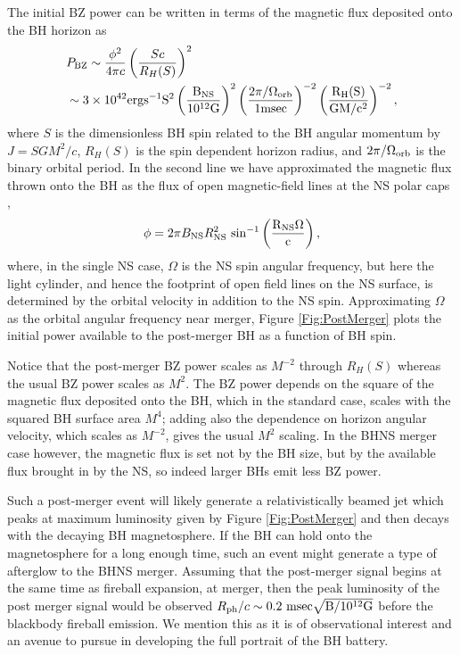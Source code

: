 The initial BZ power can be written in terms of the magnetic flux
deposited onto the BH horizon as
\begin{align}
  \label{Eq:PBZ}
&P_{\rm{BZ}} \sim \frac{\phi^2}{4 \pi c} \left(\frac{S
    c}{R_{H}(S)}\right)^2 \\ \nonumber 
%
&\sim 3 \times 10^{42}
  \rm{erg} \rm{s}^{-1} S^2 \left( \frac{B_{\rm{NS}} }{ 10^{12}
    G}\right)^2 \left( \frac{2 \pi / \Omega_{\rm{orb}} }{ 1 \rm{msec}}\right)^{-2}
  \left( \frac{R_H(S) }{ GM/c^2 }\right)^{-2} ,
\end{align}
where $S$ is the dimensionless BH spin related to the BH angular
momentum by $J = S GM^2/c$, $R_H(S)$ is the spin dependent horizon
radius, and $2 \pi / \Omega_{\rm{orb}}$ is the binary orbital period. In the second line we have approximated the magnetic flux
thrown onto the BH as the flux of open magnetic-field lines at the NS
polar caps \citep{GJ:1969, LyutikovMckinney:2011},
\begin{equation}
\phi = 2 \pi  B_{\rm NS} R^2_{\rm{NS}} \ \rm{sin}^{-1}\left(\frac{ R_{\rm{NS}} \Omega}{c}\right),
\end{equation}
where, in the single NS case, $\Omega$ is the NS spin angular
frequency, but here the light cylinder, and hence the footprint of
open field lines on the NS surface, is determined by the orbital
velocity in addition to the NS spin. Approximating $\Omega$ as the
orbital angular frequency near merger, Figure \ref{Fig:PostMerger}
plots the initial power available to the post-merger BH as a function
of BH spin.


Notice that the post-merger BZ power scales as $M^{-2}$ through
$R_H(S)$ whereas the usual BZ power scales as $M^2$. The BZ power
depends on the square of the magnetic flux deposited onto the BH,
which in the standard case, scales with the squared BH surface area $M^4$; 
adding also the dependence on horizon
angular velocity, which scales as $M^{-2}$, gives the usual $M^2$
scaling. In the BHNS merger case however, the magnetic flux is set not
by the BH size, but by the available flux brought in by the NS, so
indeed larger BHs emit less BZ power.


Such a post-merger event will likely generate a relativistically
beamed jet which peaks at maximum luminosity given by Figure
\ref{Fig:PostMerger} and then decays with the decaying BH
magnetosphere. If the BH can hold onto the magnetosphere for a long
enough time, such an event might generate a type of afterglow to the
BHNS merger.  Assuming that the post-merger signal begins at the same
time as fireball expansion, at merger, then the peak luminosity of the
post merger signal would be observed $R_{\rm{ph}}/c \sim 0.2
\ \rm{msec} \sqrt{B/10^{12}\rm{G}}$ before the blackbody fireball
emission. We mention this as it is of observational interest and an
avenue to pursue in developing the full portrait of the BH battery.





